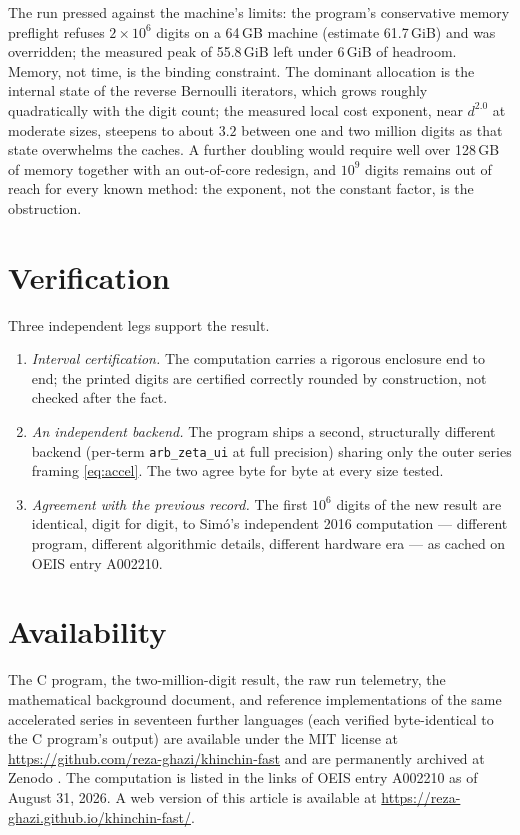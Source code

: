 \documentclass[11pt]{amsart}
\begin{document}
The run pressed against the machine's limits: the program's
conservative memory preflight refuses $2 \times 10^6$ digits on a
64\,GB machine (estimate 61.7\,GiB) and was overridden; the measured
peak of 55.8\,GiB left under 6\,GiB of headroom. Memory, not time, is
the binding constraint. The dominant allocation is the internal state
of the reverse Bernoulli iterators, which grows roughly quadratically
with the digit count; the measured local cost exponent, near
$d^{2.0}$ at moderate sizes, steepens to about $3.2$ between one and
two million digits as that state overwhelms the caches. A further
doubling would require well over 128\,GB of memory together with an
out-of-core redesign, and $10^9$ digits remains out of reach for every
known method: the exponent, not the constant factor, is the
obstruction.

\section{Verification}

Three independent legs support the result.
\begin{enumerate}
\item \emph{Interval certification.} The computation carries a
rigorous enclosure end to end; the printed digits are certified
correctly rounded by construction, not checked after the fact.
\item \emph{An independent backend.} The program ships a second,
structurally different backend (per-term \texttt{arb\_zeta\_ui} at
full precision) sharing only the outer series framing
\eqref{eq:accel}. The two agree byte for byte at every size tested.
\item \emph{Agreement with the previous record.} The first $10^6$
digits of the new result are identical, digit for digit, to Sim\'o's
independent 2016 computation \cite{simo2016} --- different program,
different algorithmic details, different hardware era --- as cached on
OEIS entry A002210.
\end{enumerate}

\section{Availability}

The C program, the two-million-digit result, the raw run telemetry,
the mathematical background document, and reference implementations of
the same accelerated series in seventeen further languages (each
verified byte-identical to the C program's output) are available under
the MIT license at
\url{https://github.com/reza-ghazi/khinchin-fast}
and are permanently archived at Zenodo
\cite{zenodo}. The computation is listed in the links of OEIS entry
A002210 \cite{oeis} as of August 31, 2026. A web version of this
article is available at
\url{https://reza-ghazi.github.io/khinchin-fast/}.
\end{document}
